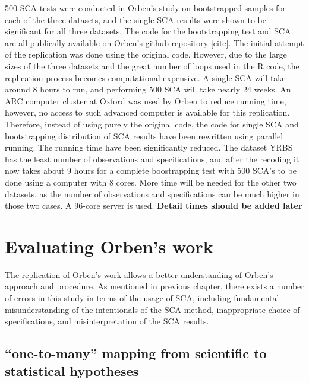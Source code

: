 \documentclass[12pt,twoside]{reedthesis}
\begin{document}
  \par 
  
  500 SCA tests were conducted in Orben's study on bootstrapped samples
  for each of the three datasets, and the single SCA results were shown to
  be significant for all three datasets. The code for the bootstrapping
  test and SCA are all publically available on Orben's github repository
  {[}cite{]}. The initial attempt of the replication was done using the
  original code. However, due to the large sizes of the three datasets and
  the great number of loops used in the R code, the replication process
  becomes computational expensive. A single SCA will take around 8 hours
  to run, and performing 500 SCA will take nearly 24 weeks. An ARC
  computer cluster at Oxford was used by Orben to reduce running time,
  however, no access to such advanced computer is available for this
  replication. Therefore, instead of using purely the original code, the
  code for single SCA and bootstrapping distribution of SCA results have
  been rewritten using parallel running. The running time have been
  significantly reduced. The dataset YRBS has the least number of
  observations and specifications, and after the recoding it now takes
  about 9 hours for a complete boostrapping test with 500 SCA's to be done
  using a computer with 8 cores. More time will be needed for the other
  two datasets, as the number of observations and specifications can be
  much higher in those two cases. A 96-core server is used.
  \textbf{Detail times should be added later}
  
  \section{Evaluating Orben's work}\label{evaluating-orbens-work}
  
  The replication of Orben's work allows a better understanding of Orben's
  approach and procedure. As mentioned in previous chapter, there exists a
  number of errors in this study in terms of the usage of SCA, including
  fundamental misunderstanding of the intentionals of the SCA method,
  inappropriate choice of specifications, and misinterpretation of the SCA
  results.
  
  \subsection{\texorpdfstring{``one-to-many'' mapping from scientific to
  statistical
  hypotheses}{one-to-many mapping from scientific to statistical hypotheses}}\label{one-to-many-mapping-from-scientific-to-statistical-hypotheses}
  
\end{document}
